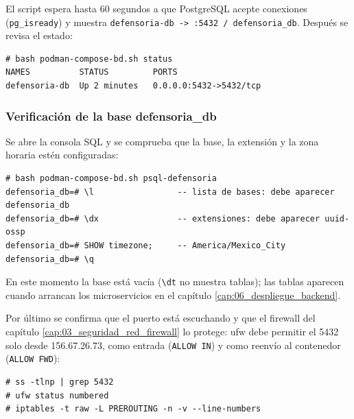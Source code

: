 El script espera hasta 60 segundos a que PostgreSQL acepte conexiones (\texttt{pg\_isready}) y muestra \texttt{defensoria-db -> :5432 / defensoria\_db}. Después se revisa el estado:
\begin{lstlisting}
# bash podman-compose-bd.sh status
NAMES          STATUS         PORTS
defensoria-db  Up 2 minutes   0.0.0.0:5432->5432/tcp
\end{lstlisting}

\subsubsection{Verificación de la base defensoria\_db}
Se abre la consola SQL y se comprueba que la base, la extensión y la zona horaria estén configuradas:
\begin{lstlisting}
# bash podman-compose-bd.sh psql-defensoria
defensoria_db=# \l                 -- lista de bases: debe aparecer defensoria_db
defensoria_db=# \dx                -- extensiones: debe aparecer uuid-ossp
defensoria_db=# SHOW timezone;     -- America/Mexico_City
defensoria_db=# \q
\end{lstlisting}
En este momento la base está vacía (\texttt{\textbackslash dt} no muestra tablas); las tablas aparecen cuando arrancan los microservicios en el capítulo \ref{cap:06_despliegue_backend}.

Por último se confirma que el puerto está escuchando y que el firewall del capítulo \ref{cap:03_seguridad_red_firewall} lo protege: ufw debe permitir el 5432 solo desde 156.67.26.73, como entrada (\texttt{ALLOW IN}) y como reenvío al contenedor (\texttt{ALLOW FWD}):
\begin{lstlisting}
# ss -tlnp | grep 5432
# ufw status numbered
# iptables -t raw -L PREROUTING -n -v --line-numbers
\end{lstlisting}

